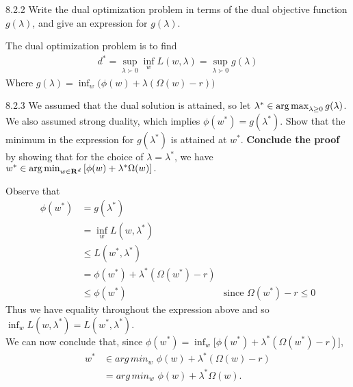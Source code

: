\documentclass[12pt,letterpaper]{article}
\begin{document}
\begin{problem}{8.2.2}
Write the dual optimization problem in terms of the
dual objective function $g(\lambda)$, and give an expression for
$g(\lambda)$.
\end{problem}
\begin{solution}{}
    The dual optimization problem is to find
    \begin{align*}
        d^*= \sup_{\lambda\succ 0} \inf_w L(w,\lambda) = \sup_{\lambda\succ 0} g(\lambda)
    \end{align*}
    Where $g(\lambda) = \inf_w\big(\phi(w)+\lambda(\Omega(w)-r)\big)$
\end{solution}
\newpage

\begin{problem}{8.2.3}
We assumed that the dual solution is attained, so let
$\lambda^{*}\in\argmax_{\lambda\ge0}g(\lambda)$. We also assumed
strong duality, which implies $\phi(w^{*})=g(\lambda^{*})$. Show
that the minimum in the expression for $g(\lambda^{*})$ is attained
at $w^{*}$.
\textbf{Conclude the proof} by showing that for the choice of $\lambda=\lambda^{*}$,
we have $w^{*}\in\argmin_{w\in\reals^{d}}\left[\phi(w)+\lambda^{*}\Omega(w)\right].$
\end{problem}
\begin{solution}{}
    Observe that
    \begin{align*}
        \phi(w^*) &= g(\lambda^*)\\
        &= \inf_w L(w,\lambda^*)\\
        &\leq  L(w^*,\lambda^*)\\
        &= \phi(w^*) + \lambda^*(\Omega(w^*) - r)\\
        &\leq \phi(w^*) & \text{since $\Omega(w^*)-r\leq0$}
    \end{align*}
    Thus we have equality throughout the expression above and so $\inf_w L(w,\lambda^*) = L(w^*,\lambda^*)$.\\
    We can now conclude that, since $\phi(w^*) = \inf_w \big[\phi(w^*) + \lambda^*(\Omega(w^*) - r)\big]$,
    \begin{align*}
        w^* &\in arg\,min_w\,\, \phi(w) + \lambda^*(\Omega(w)-r)\\
        &= arg\,min_w\,\, \phi(w) + \lambda^*\Omega(w).
    \end{align*}
\end{solution}
\end{document}
